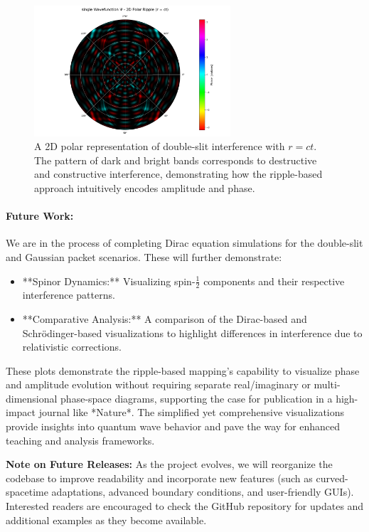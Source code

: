 \documentclass{article}
\begin{document}
\begin{figure}[htbp]
  \centering
  \includegraphics[width=0.65\textwidth]{images/double_split_wavefunction_2d_polar_r = ct.png}
  \caption{A 2D polar representation of double-slit interference with \(r = ct\). The pattern of dark and bright bands corresponds to destructive and constructive interference, demonstrating how the ripple-based approach intuitively encodes amplitude and phase.}
  \label{fig:double_slit_example}
\end{figure}

\paragraph{Future Work:}  
We are in the process of completing Dirac equation simulations for the double-slit and Gaussian packet scenarios. These will further demonstrate:
\begin{itemize}
  \item **Spinor Dynamics:** Visualizing spin-\(\tfrac{1}{2}\) components and their respective interference patterns.
  \item **Comparative Analysis:** A comparison of the Dirac-based and Schrödinger-based visualizations to highlight differences in interference due to relativistic corrections.
\end{itemize}

These plots demonstrate the ripple-based mapping’s capability to visualize phase and amplitude evolution without requiring separate real/imaginary or multi-dimensional phase-space diagrams, supporting the case for publication in a high-impact journal like *Nature*. The simplified yet comprehensive visualizations provide insights into quantum wave behavior and pave the way for enhanced teaching and analysis frameworks.

\bigskip
\noindent
\textbf{Note on Future Releases:}  
As the project evolves, we will reorganize the codebase to improve readability and incorporate new features (such as curved-spacetime adaptations, advanced boundary conditions, and user-friendly GUIs). Interested readers are encouraged to check the GitHub repository for updates and additional examples as they become available.
\end{document}
